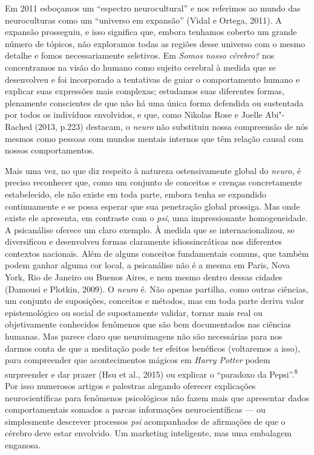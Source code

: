 Em 2011 esboçamos um ``espectro neurocultural'' e nos referimos ao mundo
das neuroculturas como um ``universo em expansão'' (Vidal e Ortega,
2011). A expansão prosseguiu, e isso significa que, embora tenhamos
coberto um grande número de tópicos, não exploramos todas as regiões
desse universo com o mesmo detalhe e fomos necessariamente seletivos. Em
\emph{Somos nosso cérebro?} nos concentramos na visão do humano como
sujeito cerebral à medida que se desenvolveu e foi incorporado a
tentativas de guiar o comportamento humano e explicar suas expressões
mais complexas; estudamos suas diferentes formas, plenamente conscientes
de que não há uma única forma defendida ou sustentada por todos os
indivíduos envolvidos, e que, como Nikolas Rose e Joelle Abi"-Rached
(2013, p.223) destacam, o \emph{neuro} não substituiu nossa compreensão
de nós mesmos como pessoas com mundos mentais internos que têm relação
causal com nossos comportamentos.

Mais uma vez, no que diz respeito à natureza ostensivamente global do
\emph{neuro}, é preciso reconhecer que, como um conjunto de conceitos e
crenças concretamente estabelecido, ele não existe em toda parte, embora
tenha se expandido continuamente e se possa esperar que sua penetração
global prossiga. Mas onde existe ele apresenta, em contraste com o
\emph{psi}, uma impressionante homogeneidade. A psicanálise oferece um
claro exemplo. À medida que se internacionalizou, se diversificou e
desenvolveu formas claramente idiossincráticas nos diferentes contextos
nacionais. Além de alguns conceitos fundamentais comuns, que também
podem ganhar alguma cor local, a psicanálise não é a mesma em Paris,
Nova York, Rio de Janeiro ou Buenos Aires, e nem mesmo dentro dessas
cidades (Damousi e Plotkin, 2009). O \emph{neuro} é. Não apenas
partilha, como outras ciências, um conjunto de suposições, conceitos e
métodos, mas em toda parte deriva valor epistemológico ou social de
supostamente validar, tornar mais real ou objetivamente conhecidos
fenômenos que são bem documentados nas ciências humanas. Mas parece
claro que neuroimagens não são necessárias para nos darmos conta de que
a meditação pode ter efeitos benéficos (voltaremos a isso), para
compreender que acontecimentos mágicos em \emph{Harry Potter} podem
surpreender e dar prazer (Hsu et al., 2015) ou explicar o ``paradoxo da
Pepsi''.\textsuperscript{8} Por isso numerosos artigos e palestras
alegando oferecer explicações neurocientíficas para fenômenos
psicológicos não fazem mais que apresentar dados comportamentais somados
a parcas informações neurocientíficas --- ou simplesmente descrever
processos \emph{psi} acompanhados de afirmações de que o cérebro deve
estar envolvido. Um marketing inteligente, mas uma embalagem enganosa.

